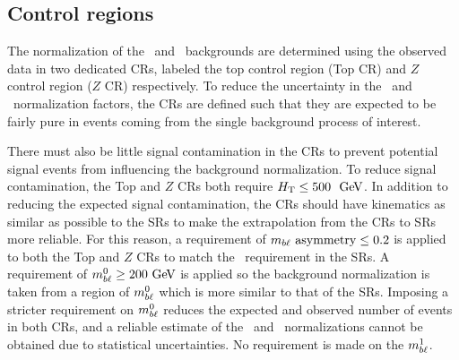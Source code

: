 

\FloatBarrier
\subsection{Control regions}
\label{sec:cr}

The normalization of the \TTBAR\ and \ZGAMMAJETS\ backgrounds are determined
using the observed data in two dedicated CRs, labeled the top control region
(Top CR) and $Z$ control region ($Z$ CR) respectively.
To reduce the uncertainty in the \TTBAR\ and \ZGAMMAJETS\ normalization factors,
the CRs are defined such that they are expected to be fairly pure in events
coming from the single background process of interest.

There must also be little signal contamination in the CRs to prevent potential
signal events from influencing the background normalization.
To reduce signal contamination, the Top and $Z$ CRs both require
$\HT \leq 500~\GeV$.
In addition to reducing the expected signal contamination, the CRs should have
kinematics as similar as possible to the SRs to make the extrapolation from the
CRs to SRs more reliable.
For this reason, a requirement of $m_{b\ell}~\mathrm{asymmetry} \leq 0.2$ is applied to both the
Top and $Z$ CRs to match the \MBLASYM\ requirement in the SRs.
A requirement of $\MBL^0 \geq 200 \GeV$ is applied so the background
normalization is taken from a region of $m_{b\ell}^0$ which is more similar to that
of the SRs.
Imposing a stricter requirement on $m_{b\ell}^0$ reduces the expected and observed
number of events in both CRs, and a reliable estimate of the \TTBAR\ and
\ZGAMMAJETS\ normalizations cannot be obtained due to statistical uncertainties.
No requirement is made on the $m_{b\ell}^1$.

